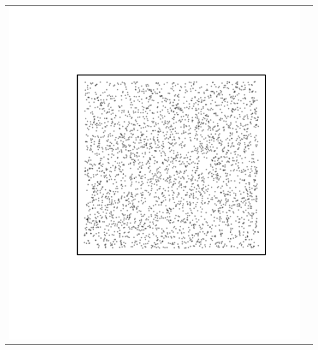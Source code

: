\documentclass{article}\usepackage{graphicx, color}
\makeatletter
\def\maxwidth{ %
  \ifdim\Gin@nat@width>\linewidth
    \linewidth
  \else
    \Gin@nat@width
  \fi
}
\newenvironment{knitrout}{}{} %
\makeatother
\begin{document}
\vspace*{-1.75in}
\begin{tabular}{cc}
\begin{knitrout}
\definecolor{shadecolor}{rgb}{0.969, 0.969, 0.969}\color{fgcolor}\includegraphics[width=\maxwidth]{figure/unnamed-chunk-3} 
\end{knitrout}


\end{tabular}
\end{document}
